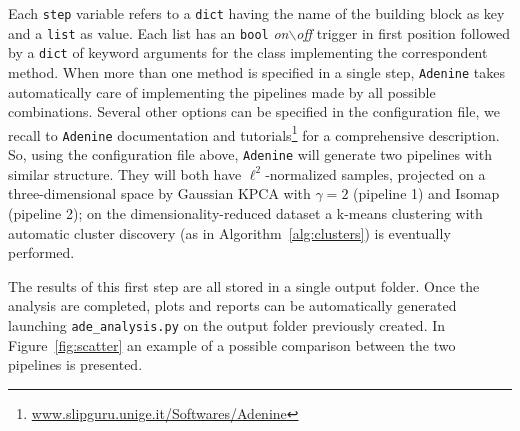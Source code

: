\documentclass[twoside,11pt]{article}
\makeatletter
\newcommand{\ade}{\texttt{Adenine}\@\xspace}
\makeatother
\begin{document}
\noindent Each \texttt{step} variable refers to a \texttt{dict} having the name of the building block as key and a \texttt{list} as value. Each list has an \texttt{bool} \emph{on$\backslash$off} trigger in first position followed by a \texttt{dict} of keyword arguments for the class implementing the correspondent method. When more than one method is specified in a single step, \ade takes automatically care of implementing the pipelines made by all possible combinations. Several other options can be specified in the configuration file, we recall to \ade documentation and tutorials\footnote{\href{www.slipguru.unige.it/Softwares/Adenine}{www.slipguru.unige.it/Softwares/Adenine}} for a comprehensive description. So, using the configuration file above, \ade will generate two pipelines with similar structure. They will both have $\ell^2$-normalized samples, projected on a three-dimensional space by Gaussian KPCA with $\gamma=2$ (pipeline 1) and Isomap (pipeline 2); on the dimensionality-reduced dataset a k-means clustering with automatic cluster discovery (as in Algorithm~\ref{alg:clusters}) is eventually performed.

The results of this first step are all stored in a single output folder. Once the analysis are completed, plots and reports can be automatically generated launching \texttt{ade\_analysis.py} on the output folder previously created. In Figure~\ref{fig:scatter} an example of a possible comparison between the two pipelines is presented.
\end{document}
